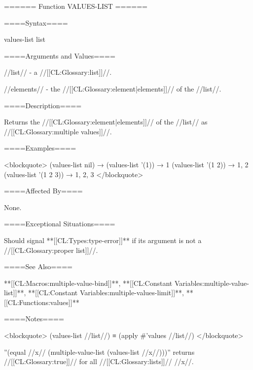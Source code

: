 ====== Function VALUES-LIST ======

====Syntax====

\DefunWithValues values-list {list} {}

====Arguments and Values====

//list// - a //[[CL:Glossary:list]]//.

//elements// - the //[[CL:Glossary:element|elements]]// of the //list//.

====Description====

Returns the //[[CL:Glossary:element|elements]]// of the //list// as //[[CL:Glossary:multiple values]]//.

====Examples====

<blockquote> (values-list nil) → \novalues (values-list '(1)) → 1 (values-list '(1 2)) → 1, 2 (values-list '(1 2 3)) → 1, 2, 3 </blockquote>

====Affected By====

None.

====Exceptional Situations====

Should signal **[[CL:Types:type-error]]** if its argument is not a //[[CL:Glossary:proper list]]//.

====See Also====

**[[CL:Macros:multiple-value-bind]]**, **[[CL:Constant Variables:multiple-value-list]]**, **[[CL:Constant Variables:multiple-values-limit]]**, **[[CL:Functions:values]]**

====Notes====

<blockquote> (values-list //list//) ≡ (apply #'values //list//) </blockquote>

''(equal //x// (multiple-value-list (values-list //x//)))'' returns //[[CL:Glossary:true]]// for all //[[CL:Glossary:lists]]// //x//.

